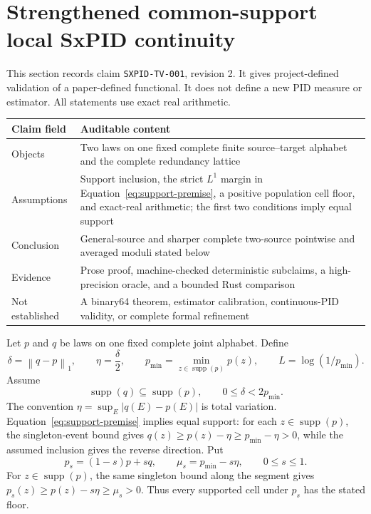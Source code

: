 \documentclass[11pt]{article}
\theoremstyle{definition}
\newcommand{\supp}{\operatorname{supp}}
\newcommand{\normone}[1]{\left\lVert #1\right\rVert_1}
\begin{document}
\section{Strengthened common-support local SxPID continuity}

	This section records claim \texttt{SXPID-TV-001}, revision 2.  It gives project-defined validation
	of a paper-defined functional.  It does not define a new PID measure or estimator.  All statements
	use exact real arithmetic.

	\begin{center}
	\begin{tabular}{L{0.20\textwidth}L{0.70\textwidth}}
	\toprule
	\PidTableHeaderRow
	Claim field & Auditable content \\
	\midrule
	Objects & Two laws on one fixed complete finite source--target alphabet and the complete
	redundancy lattice \\
	Assumptions & Support inclusion, the strict $L^1$ margin in
	Equation~\eqref{eq:support-premise}, a positive population cell floor, and exact-real arithmetic;
	the first two conditions imply equal support \\
	Conclusion & General-source and sharper complete two-source pointwise and averaged moduli stated
	below \\
	Evidence & Prose proof, machine-checked deterministic subclaims, a high-precision oracle, and a
	bounded Rust comparison \\
	Not established & A binary64 theorem, estimator calibration, continuous-PID validity, or complete
	formal refinement \\
	\bottomrule
	\end{tabular}
	\end{center}

Let $p$ and $q$ be laws on one fixed complete joint alphabet.  Define
\begin{equation}
  \delta=\normone{q-p},
  \qquad
  \eta=\frac{\delta}{2},
  \qquad
  p_{\min}=\min_{z\in\supp(p)}p(z),
  \qquad
  L=\log(1/p_{\min}).
\end{equation}
Assume
\begin{equation}\label{eq:support-premise}
  \supp(q)\subseteq\supp(p),
  \qquad
  0\le\delta<2p_{\min}.
	\end{equation}
	The convention $\eta=\sup_E|q(E)-p(E)|$ is total variation.  Equation~\eqref{eq:support-premise}
	implies equal support: for each $z\in\supp(p)$, the singleton-event bound gives
	$q(z)\ge p(z)-\eta\ge p_{\min}-\eta>0$, while the assumed inclusion gives the reverse direction.
	Put
\begin{equation}
  p_s=(1-s)p+sq,
  \qquad
  \mu_s=p_{\min}-s\eta,
  \qquad
  0\le s\le1.
	\end{equation}
	For $z\in\supp(p)$, the same singleton bound along the segment gives
	$p_s(z)\ge p(z)-s\eta\ge\mu_s>0$.  Thus every supported cell under $p_s$ has the stated floor.
\end{document}
